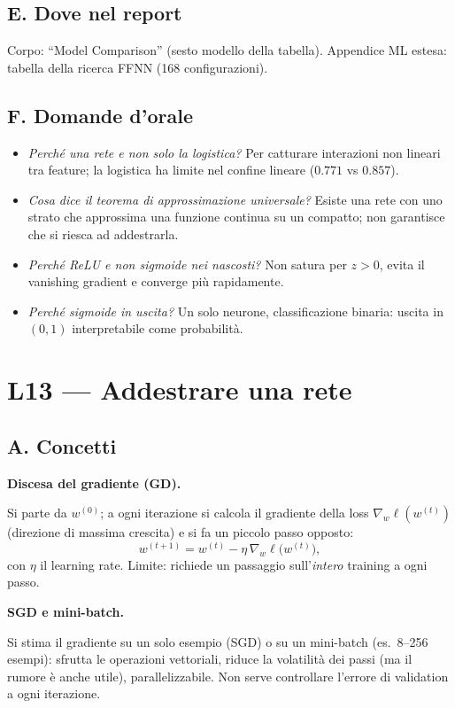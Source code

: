 \documentclass[11pt,a4paper]{article}
\newcommand{\dom}[1]{\par\smallskip\noindent\textbf{#1}\par\nopagebreak}
\begin{document}
\subsection*{E. Dove nel report}
Corpo: ``Model Comparison'' (sesto modello della tabella). Appendice ML estesa: tabella della ricerca FFNN (168 configurazioni).

\subsection*{F. Domande d'orale}
\begin{itemize}
\item \emph{Perch\'e una rete e non solo la logistica?} Per catturare interazioni non lineari tra feature; la logistica ha limite nel confine lineare ($0.771$ vs $0.857$).
\item \emph{Cosa dice il teorema di approssimazione universale?} Esiste una rete con uno strato che approssima una funzione continua su un compatto; non garantisce che si riesca ad addestrarla.
\item \emph{Perch\'e ReLU e non sigmoide nei nascosti?} Non satura per $z>0$, evita il vanishing gradient e converge pi\`u rapidamente.
\item \emph{Perch\'e sigmoide in uscita?} Un solo neurone, classificazione binaria: uscita in $(0,1)$ interpretabile come probabilit\`a.
\end{itemize}

\clearpage
\section{L13 --- Addestrare una rete}
\subsection*{A. Concetti}

\dom{Discesa del gradiente (GD).} Si parte da $w^{(0)}$; a ogni iterazione si calcola il gradiente della loss $\nabla_w\ell(w^{(t)})$ (direzione di massima crescita) e si fa un piccolo passo opposto:
\[
w^{(t+1)}=w^{(t)}-\eta\,\nabla_w\ell\big(w^{(t)}\big),
\]
con $\eta$ il learning rate. Limite: richiede un passaggio sull'\emph{intero} training a ogni passo.

\dom{SGD e mini-batch.} Si stima il gradiente su un solo esempio (SGD) o su un mini-batch (es.\ 8--256 esempi): sfrutta le operazioni vettoriali, riduce la volatilit\`a dei passi (ma il rumore \`e anche utile), parallelizzabile. Non serve controllare l'errore di validation a ogni iterazione.
\end{document}
